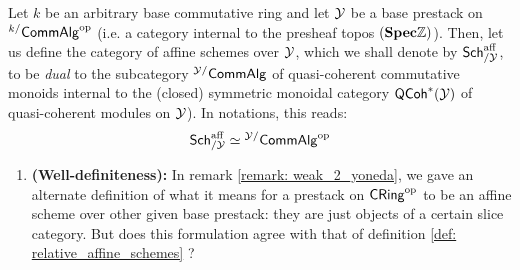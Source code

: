                     \begin{definition} \label{def: relative_affine_schemes}
                        Let $k$ be an arbitrary base commutative ring and let $\mathcal{Y}$ be a base prestack on ${}^{k/}\mathsf{Comm}\mathsf{Alg}^{\mathrm{op}}$ (i.e. a category internal to the presheaf topos $(\mathbf{Spec} \mathbb{Z})$). Then, let us define the category of affine schemes over $\mathcal{Y}$, which we shall denote by $\mathsf{Sch}^{\mathrm{aff}}_{/\mathcal{Y}}$, to be \textit{dual} to the subcategory ${}^{\mathcal{Y}/}\mathsf{Comm}\mathsf{Alg}$ of quasi-coherent commutative monoids internal to the (closed) symmetric monoidal category $\mathsf{QCoh}^*(\mathcal{Y})$ of quasi-coherent modules on $\mathcal{Y}$). In notations, this reads:
                            $$\mathsf{Sch}^{\mathrm{aff}}_{/\mathcal{Y}} \simeq {}^{\mathcal{Y}/}\mathsf{Comm}\mathsf{Alg}^{\mathrm{op}}$$
                    \end{definition}
                    \begin{remark}
                        \noindent
                        \begin{enumerate}
                            \item \textbf{(Well-definiteness):} In remark \ref{remark: weak_2_yoneda}, we gave an alternate definition of what it means for a prestack on $\mathsf{CRing}^{\mathrm{op}}$ to be an affine scheme over other given base prestack: they are just objects of a certain slice category. But does this formulation agree with that of definition \ref{def: relative_affine_schemes} ? 
                        

\end{enumerate}
\end{remark}
